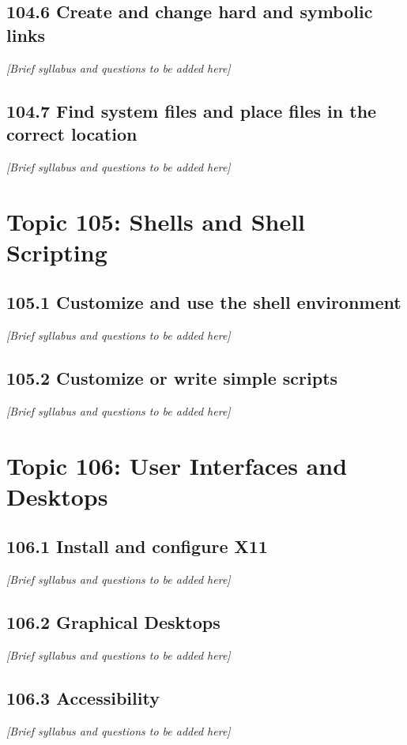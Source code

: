 \documentclass[12pt,a4paper]{report}
\begin{document}
\section{104.6 Create and change hard and symbolic links}
\textit{[Brief syllabus and questions to be added here]}

\section{104.7 Find system files and place files in the correct location}
\textit{[Brief syllabus and questions to be added here]}

\chapter{Topic 105: Shells and Shell Scripting}
\section{105.1 Customize and use the shell environment}
\textit{[Brief syllabus and questions to be added here]}

\section{105.2 Customize or write simple scripts}
\textit{[Brief syllabus and questions to be added here]}

\chapter{Topic 106: User Interfaces and Desktops}
\section{106.1 Install and configure X11}
\textit{[Brief syllabus and questions to be added here]}

\section{106.2 Graphical Desktops}
\textit{[Brief syllabus and questions to be added here]}

\section{106.3 Accessibility}
\textit{[Brief syllabus and questions to be added here]}
\end{document}
